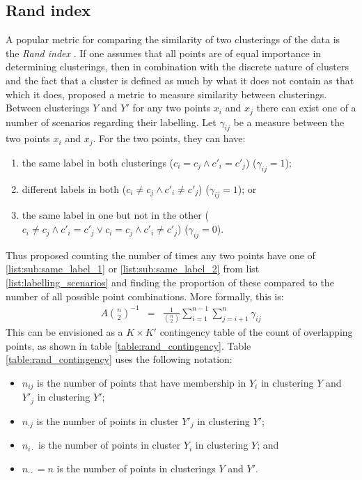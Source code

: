 \documentclass[12pt]{article} %
\begin{document}
	\subsection{Rand index} \label{sec:rand_index}
	A popular metric for comparing the similarity of two clusterings of the data is the \emph{Rand index} \citep{RandObjectiveCriteriaEvaluation1971}. If one assumes that all points are of equal importance in determining clusterings, then in combination with the discrete nature of clusters and the fact that a cluster is defined as much by what it does not contain as that which it does, \citet{RandObjectiveCriteriaEvaluation1971} proposed a metric to measure similarity between clusterings. Between clusterings $Y$ and $Y'$ for any two points $x_i$ and $x_j$ there can exist one of a number of scenarios regarding their labelling. Let $\gamma_{ij}$ be a measure between the two points $x_i$ and $x_j$. For the two points, they can have:
	\begin{enumerate} \label{list:labelling_scenarios}
		\item the same label in both clusterings ($c_i = c_j \land c'_i = c'_j$) ($\gamma_{ij}=1$); \label{list:sub:same_label_1}
		\item different labels in both ($c_i \neq c_j \land c'_i \neq c'_j$) ($\gamma_{ij}=1$); or \label{list:sub:same_label_2}
		\item the same label in one but not in the other ($c_i \neq c_j \land c'_i = c'_j \lor c_i = c_j \land c'_i \neq c'_j$) ($\gamma_{ij}=0$). \label{list:sub:different_label}
	\end{enumerate}
	Thus \citet{RandObjectiveCriteriaEvaluation1971} proposed counting the number of times any two points have one of \ref{list:sub:same_label_1} or \ref{list:sub:same_label_2} from list \ref{list:labelling_scenarios} and finding the proportion of these compared to the number of all possible point combinations. More formally, this is:
	\begin{eqnarray} \label{eqn:rand_index}
	A \binom{n}{2}^{-1} & = & \frac{1}{\binom{n}{2}} \sum_{i=1}^{n-1}\sum_{j=i + 1}^n\gamma_{ij} 
	\end{eqnarray}
	This can be envisioned as a $K \times K'$ contingency table of the count of overlapping points, as shown in table \ref{table:rand_contingency}. Table \ref{table:rand_contingency} uses the following notation:
	\begin{itemize}
		\item $n_{ij}$ is the number of points that have membership in $Y_i$ in clustering $Y$ and $Y'_j$ in clustering $Y'$;
		\item $n_{\cdot j}$ is the number of points in cluster $Y'_j$ in clustering $Y'$;
		\item $n_{i \cdot}$ is the number of points in cluster $Y_i$ in clustering $Y$; and
		\item $n_{\cdot \cdot} = n$ is the number of points in clusterings $Y$ and $Y'$.
	\end{itemize}
\end{document}
